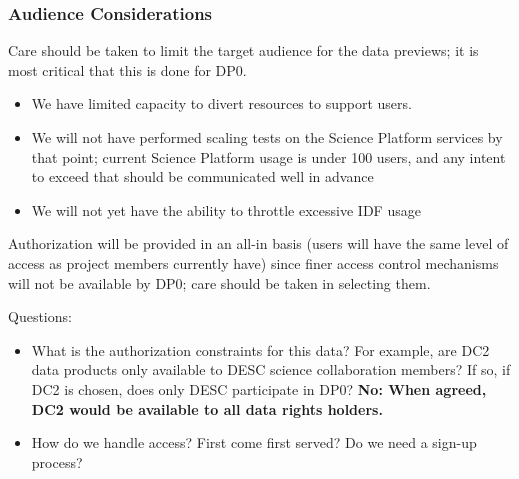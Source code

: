 \subsubsection{Audience Considerations}

Care should be taken to limit the target audience for the data previews; it is most critical that this is done for DP0.

\begin{itemize}

\item We have limited capacity to divert resources to support users.

\item We will not have performed scaling tests on the Science Platform services by that point; current Science Platform usage is under 100 users, and any intent to exceed that should be communicated well in advance

\item We will not yet have the ability to throttle excessive IDF usage

\end{itemize}

Authorization will be provided in an all-in basis (users will have the same level of access as project members currently have) since finer access control mechanisms will not be available by DP0; care should be taken in selecting them.

Questions:

\begin{itemize}

\item What is the authorization constraints for this data? For example, are DC2 data products only available to DESC science collaboration members? If so, if DC2 is chosen, does only DESC participate in DP0?
	{\bf No: When agreed, DC2 would be available to all data rights holders.}

\item How do we handle access? First come first served? Do we need a sign-up process?

\end{itemize}

